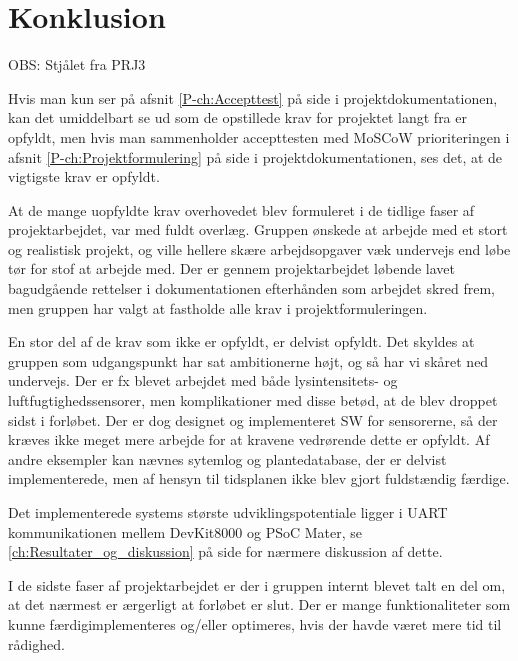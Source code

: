 \chapter{Konklusion}
\label{ch:Konklusion}

OBS: Stjålet fra PRJ3

Hvis man kun ser på afsnit \ref{P-ch:Accepttest}  på side \pageref{P-ch:Accepttest} i projektdokumentationen, kan det umiddelbart se ud som de opstillede krav for projektet langt fra er opfyldt, men hvis man sammenholder accepttesten med MoSCoW prioriteringen i afsnit \ref{P-ch:Projektformulering}  på side \pageref{P-ch:Projektformulering} i projektdokumentationen, ses det, at de vigtigste krav er opfyldt. 

At de mange uopfyldte krav overhovedet blev formuleret i de tidlige faser af projektarbejdet, var med fuldt overlæg. 
Gruppen ønskede at arbejde med et stort og realistisk projekt, og ville hellere skære arbejdsopgaver væk undervejs end løbe tør for stof at arbejde med. 
Der er gennem projektarbejdet løbende lavet bagudgående rettelser i dokumentationen efterhånden som arbejdet skred frem, men gruppen har valgt at fastholde alle krav i projektformuleringen. 

En stor del af de krav som ikke er opfyldt, er delvist opfyldt. 
Det skyldes at gruppen som udgangspunkt har sat ambitionerne højt, og så har vi skåret ned undervejs. 
Der er fx blevet arbejdet med både lysintensitets- og luftfugtighedssensorer, men komplikationer med disse betød, at de blev droppet sidst i forløbet. 
Der er dog designet og implementeret SW for sensorerne, så der kræves ikke meget mere arbejde for at kravene vedrørende dette er opfyldt. 
Af andre eksempler kan nævnes sytemlog og plantedatabase, der er delvist implementerede, men af hensyn til tidsplanen ikke blev gjort fuldstændig færdige. 

Det implementerede systems største udviklingspotentiale ligger i UART kommunikationen mellem DevKit8000 og PSoC Mater, se \ref{ch:Resultater_og_diskussion}  på side \pageref{ch:Resultater_og_diskussion} for nærmere diskussion af dette. 

I de sidste faser af projektarbejdet er der i gruppen internt blevet talt en del om, at det nærmest er ærgerligt at forløbet er slut. 
Der er mange funktionaliteter som kunne færdigimplementeres og/eller optimeres, hvis der havde været mere tid til rådighed. 

\mbox{}

